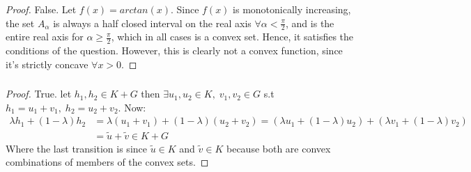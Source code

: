 \subsubsection{}
\begin{proof}
    False. Let $f(x) = arctan(x)$. Since $f(x)$ is monotonically increasing, the set $A_\alpha$ is always a half closed interval on the real axis $\forall \alpha < \frac{\pi}{2}$, and is the entire real axis for $\alpha \geq \frac{\pi}{2}$, which in all cases is a convex set. Hence, it satisfies the conditions of the question. However, this is clearly not a convex function, since it's strictly concave $\forall x > 0$.
\end{proof}

\subsubsection{}
\begin{proof}
    True. let $h_1,h_2 \in K + G$ then $\exists u_1,u_2 \in K, \; v_1,v_2 \in G$ s.t $h_1=u_1+v_1, \; h_2=u_2+v_2$. Now:
    \begin{equation*}
        \begin{split}            
            \lambda h_1 + (1-\lambda) h_2 &= \lambda (u_1 + v_1) + (1-\lambda) (u_2 + v_2) = 
            \left(\lambda u_1 + (1-\lambda) u_2 \right) +  \left(\lambda v_1 + (1-\lambda) v_2 \right) \\
            &= \tilde{u} + \tilde{v} \in K+G
        \end{split}
    \end{equation*} 
    Where the last transition is since $\tilde{u} \in K$ and $\tilde{v} \in K$ because both are convex combinations of members of the convex sets.
\end{proof}
